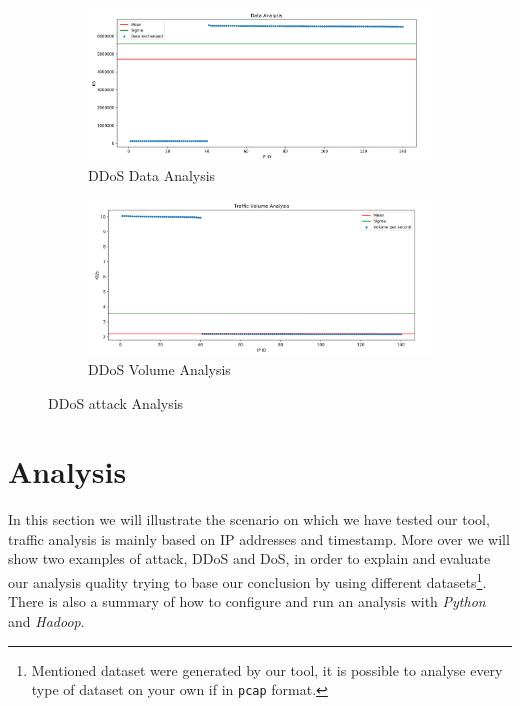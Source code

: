 \begin{figure}[h]
	\begin{subfigure}{0.48\textwidth}
		\includegraphics[width=\textwidth]{imgs/ddos_atk-data_analysis.png}
		\caption{DDoS Data Analysis} 
		\label{fig:ddos_data}
	\end{subfigure}
	\hspace*{\fill} %
	\begin{subfigure}{0.48\textwidth}
		\includegraphics[width=\textwidth]{imgs/ddos_atk-volume_analysis.png}
		\caption{DDoS Volume Analysis} 
		\label{fig:ddos_volume}
	\end{subfigure}
	\caption{DDoS attack Analysis}
	\label{fig:ddos_analysis}
\end{figure}

\section{Analysis}
\label{sec:analysis}
In this section we will illustrate the scenario on which we have tested our tool, traffic analysis is mainly based on IP addresses and timestamp\cite{ddos_forensics}. More over we will show two examples of attack, DDoS and DoS, in order to explain and evaluate our analysis quality trying to base our conclusion by using different datasets\footnote{Mentioned dataset were generated by our tool, it is possible to analyse every type of dataset on your own if in \texttt{pcap} format.}. There is also a summary of how to configure and run an analysis with \textit{Python} and \textit{Hadoop}.


